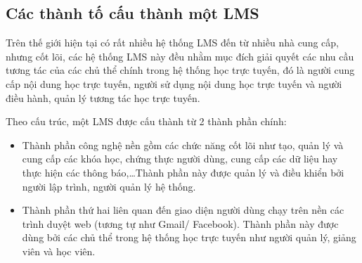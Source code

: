 \subsection{Các thành tố cấu thành một LMS}
{Trên thế giới hiện tại có rất nhiều hệ thống LMS đến từ nhiều nhà cung cấp, nhưng cốt lõi, các hệ thống LMS này đều nhằm mục đích giải quyết các nhu cầu tương tác của các chủ thể chính trong hệ thống học trực tuyến, đó là người cung cấp nội dung học trực tuyến, người sử dụng nội dung học trực tuyến và người điều hành, quản lý tương tác học trực tuyến.}

{Theo cấu trúc, một LMS được cấu thành từ 2 thành phần chính:}
\begin{itemize}
	\item Thành phần công nghệ nền gồm các chức năng cốt lõi như tạo, quản lý và cung cấp các khóa học, chứng thực người dùng, cung cấp các dữ liệu hay thực hiện các thông báo,…Thành phần này được quản lý và điều khiển bởi người lập trình, người quản lý hệ thống.
	\item Thành phần thứ hai liên quan đến giao diện người dùng chạy trên nền các trình duyệt web (tương tự như Gmail/ Facebook). Thành phần này được dùng bởi các chủ thể trong hệ thống học trực tuyến như người quản lý, giảng viên và học viên.
\end{itemize}

